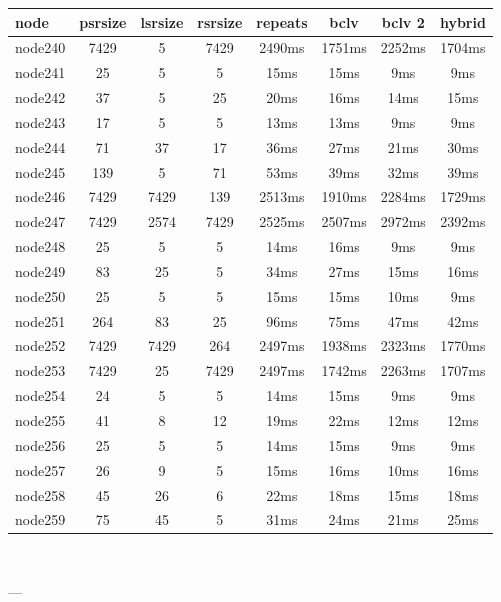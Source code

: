 \begin{tabular}{|l|c|c|c|c|c|c|c|}
\hline node & psrsize & lsrsize & rsrsize   & repeats & bclv & bclv 2 & hybrid\\
    \hline node240 & 7429 & 5 & 7429 & 2490ms & 1751ms & 2252ms & 1704ms\\
    \hline node241 & 25 & 5 & 5 & 15ms & 15ms & 9ms & 9ms\\
    \hline node242 & 37 & 5 & 25 & 20ms & 16ms & 14ms & 15ms\\
    \hline node243 & 17 & 5 & 5 & 13ms & 13ms & 9ms & 9ms\\
    \hline node244 & 71 & 37 & 17 & 36ms & 27ms & 21ms & 30ms\\
    \hline node245 & 139 & 5 & 71 & 53ms & 39ms & 32ms & 39ms\\
    \hline node246 & 7429 & 7429 & 139 & 2513ms & 1910ms & 2284ms & 1729ms\\
    \hline node247 & 7429 & 2574 & 7429 & 2525ms & 2507ms & 2972ms & 2392ms\\
    \hline node248 & 25 & 5 & 5 & 14ms & 16ms & 9ms & 9ms\\
    \hline node249 & 83 & 25 & 5 & 34ms & 27ms & 15ms & 16ms\\
    \hline node250 & 25 & 5 & 5 & 15ms & 15ms & 10ms & 9ms\\
    \hline node251 & 264 & 83 & 25 & 96ms & 75ms & 47ms & 42ms\\
    \hline node252 & 7429 & 7429 & 264 & 2497ms & 1938ms & 2323ms & 1770ms\\
    \hline node253 & 7429 & 25 & 7429 & 2497ms & 1742ms & 2263ms & 1707ms\\
    \hline node254 & 24 & 5 & 5 & 14ms & 15ms & 9ms & 9ms\\
    \hline node255 & 41 & 8 & 12 & 19ms & 22ms & 12ms & 12ms\\
    \hline node256 & 25 & 5 & 5 & 14ms & 15ms & 9ms & 9ms\\
    \hline node257 & 26 & 9 & 5 & 15ms & 16ms & 10ms & 16ms\\
    \hline node258 & 45 & 26 & 6 & 22ms & 18ms & 15ms & 18ms\\
    \hline node259 & 75 & 45 & 5 & 31ms & 24ms & 21ms & 25ms\\

\hline
\end{tabular} \

---


